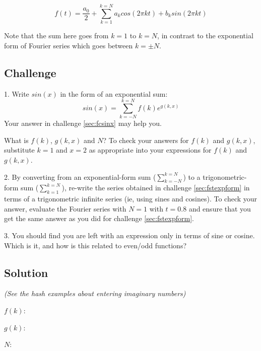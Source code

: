 \begin{equation}
    \label{eq:fsoftintrigform}
    f(t) = \frac{a_0}{2} + \sum_{k=1}^{k=N} a_k cos(2 \pi k t) + b_k sin(2 \pi k t)
\end{equation}

Note that the sum here goes from $k=1$ to $k=N$, in contrast to the exponential form of Fourier series which goes between $k=\pm N$.

\subsection*{Challenge}
1. Write $sin(x)$ in the form of an exponential sum:
\begin{equation}
    sin(x)=\sum_{k=-N}^{k=N} f(k) e^{g(k,x)}
\end{equation}
Your answer in challenge \ref{sec:fcsinx} may help you.

What is $f(k)$, $g(k,x)$ and $N$? To check your answers for $f(k)$ and $g(k,x)$, substitute $k=1$ and $x=2$ as appropriate into your expressions for $f(k)$ and $g(k,x)$.

2. By converting from an exponential-form sum ($\sum_{k=-N}^{k=N}$) to a trigonometric-form sum ($\sum_{k=1}^{k=N}$), re-write the series obtained in challenge \ref{sec:fstexpform} in terms of a trigonometric infinite series (ie, using sines and cosines). To check your answer, evaluate the Fourier series with $N=1$ with $t=0.8$ and ensure that you get the same answer as you did for challenge \ref{sec:fstexpform}.

3. You should find you are left with an expression only in terms of sine or cosine. Which is it, and how is this related to even/odd functions?

\subsection*{Solution}
\emph{(See the hash examples about entering imaginary numbers)}

$f(k)$: 

$g(k)$: 

$N$: 

\timebox




\newpage
